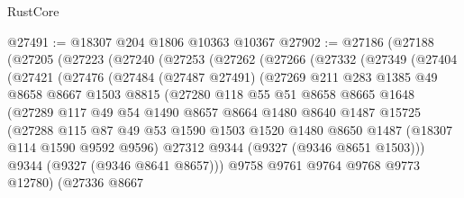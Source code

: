 \begin{lexlean}{RustCore}
\begin{coremodule}
@27491 := @18307 @204 @1806 @10363 @10367
@27902 := @27186
    (@27188
      (@27205
        (@27223
          (@27240
            (@27253
              (@27262
                (@27266
                  (@27332
                    (@27349
                      (@27404
                        (@27421
                          (@27476
                            (@27484
                              (@27487 @27491)
                              (@27269
                                @211
                                @283
                                @1385
                                @49
                                @8658
                                @8667
                                @1503
                                @8815
                                (@27280
                                  @118
                                  @55
                                  @51
                                  @8658
                                  @8665
                                  @1648
                                  (@27289
                                    @117
                                    @49
                                    @54
                                    @1490
                                    @8657
                                    @8664
                                    @1480
                                    @8640
                                    @1487
                                    @15725
                                    (@27288
                                      @115
                                      @87
                                      @49
                                      @53
                                      @1590
                                      @1503
                                      @1520
                                      @1480
                                      @8650
                                      @1487
                                      (@18307 @114 @1590 @9592 @9596)
                                      @27312
                                      @9344
                                      (@9327 (@9346 @8651 @1503)))
                                    @9344
                                    (@9327 (@9346 @8641 @8657)))
                                  @9758
                                  @9761
                                  @9764
                                  @9768
                                  @9773
                                  @12780)
                                (@27336
                                  @8667

\end{coremodule}
\end{lexlean}
